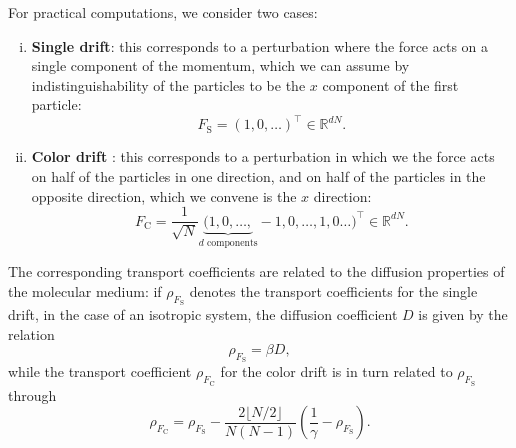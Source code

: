 \documentclass[pdflatex,sn-mathphys]{sn-jnl}%
\theoremstyle{thmstyleone}%
\theoremstyle{thmstyletwo}%
\theoremstyle{thmstylethree}%
\newcommand{\1}{\mathbbm{1}}
\renewcommand{\R}{\mathbb{R}}
\begin{document}
For practical computations, we consider two cases:
\begin{enumerate}[(i)]
    \item \textbf{Single drift}: this corresponds to a perturbation where the force acts on a single component of the momentum, which we can assume by indistinguishability of the particles to be the $x$ component of the first particle: \[F_{\mathrm{S}}=(1,0,\dots)^\intercal \in \R^{dN}.\]
    \item \textbf{Color drift} \cite[Chapter 6]{EM08}: this corresponds to a perturbation in which we the force acts on half of the particles in one direction, and on half of the particles in the opposite direction, which we convene is the $x$ direction: \[F_{\mathrm{C}}=\frac1{\sqrt N}\underbrace{(1,0,\dots,}_{d \text{ components}}-1,0,\dots,1,0\dots)^\intercal \in \R^{dN}.\]
\end{enumerate}
The corresponding transport coefficients are related to the diffusion properties of the molecular medium: if $\rho_{F_{\mathrm{S}}}$ denotes the transport coefficients for the single drift, in the case of an isotropic system, the diffusion coefficient $D$ is given by the relation
\begin{equation}
    \label{eq:diffusion_coefficient}
    \rho_{F_{\mathrm S}} = \beta D,
\end{equation}
while the transport coefficient $\rho_{F_{\mathrm C}}$ for the color drift is in turn related to $\rho_{F_{\mathrm S}}$ through
\begin{equation}
\label{eq:color_drift_relation}
    \rho_{F_{\mathrm{C}}}=\rho_{F_{\mathrm S}}-\frac{2\lfloor N/2 \rfloor}{N(N-1)}\left(\frac1{\gamma}-\rho_{F_{\mathrm S}}\right).
\end{equation}
\end{document}
